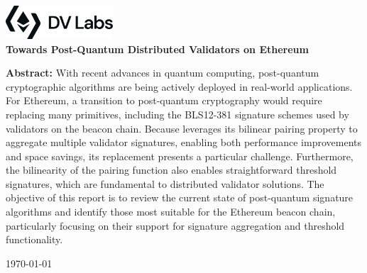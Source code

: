 \documentclass[a4paper,11pt]{article}
\begin{document}
\begin{titlepage}
    \centering
    \includegraphics[width=0.3\textwidth]{logo.png}\\[1cm]

    {\Huge\bfseries\sffamily Towards Post-Quantum Distributed Validators on Ethereum}\\[1cm]

    \begin{tcolorbox}[colback=graybox, colframe=white, rounded corners]
        \textbf{Abstract:}
        With recent advances in quantum computing, post-quantum cryptographic algorithms are being actively deployed in real-world applications.
        For Ethereum, a transition to post-quantum cryptography would require replacing many primitives, including the \textsf{BLS12-381} signature schemes used by validators on the beacon chain.
Because \BLS leverages its bilinear pairing property to aggregate multiple validator signatures, enabling both performance improvements and
space savings, its replacement presents a particular challenge.
Furthermore, the bilinearity of the pairing function also enables straightforward threshold signatures, which are fundamental to distributed validator solutions.
The objective of this report is to review the current state of post-quantum signature algorithms and identify those most suitable for the Ethereum beacon chain, particularly focusing on their support for signature aggregation and threshold functionality.
    \end{tcolorbox}

	{
		\hypersetup{linkcolor=black}
		\tableofcontents
	}
	
	\vfill
    {\large \today}
\end{titlepage}













\end{document}
